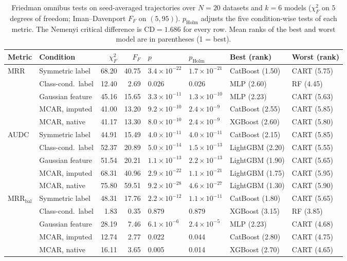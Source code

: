 \begin{table}[t]
\centering
\footnotesize
\setlength{\tabcolsep}{3.5pt}
\caption{Friedman omnibus tests on seed-averaged trajectories over $N=20$ datasets and $k=6$ models ($\chi^2_F$ on $5$ degrees of freedom; Iman--Davenport $F_F$ on $(5,95)$). $p_{\mathrm{Holm}}$ adjusts the five condition-wise tests of each metric. The Nemenyi critical difference is $\mathrm{CD}=1.686$ for every row. Mean ranks of the best and worst model are in parentheses (1 = best).}
\label{tab:friedman}
\begin{tabular}{@{}llrrllll@{}}
\toprule
Metric & Condition & $\chi^2_F$ & $F_F$ & $p$ & $p_{\mathrm{Holm}}$ & Best (rank) & Worst (rank) \\
\midrule
MRR & Symmetric label & 68.20 & 40.75 & $3.4\times10^{-22}$ & $1.7\times10^{-21}$ & CatBoost (1.50) & CART (5.75) \\
 & Class-cond.\ label & 12.40 & 2.69 & 0.026 & 0.026 & MLP (2.60) & RF (4.45) \\
 & Gaussian feature & 45.16 & 15.65 & $3.3\times10^{-11}$ & $1.3\times10^{-10}$ & MLP (2.23) & CART (5.63) \\
 & MCAR, imputed & 41.00 & 13.20 & $9.2\times10^{-10}$ & $2.4\times10^{-9}$ & CatBoost (2.55) & CART (5.85) \\
 & MCAR, native & 41.17 & 13.30 & $8.0\times10^{-10}$ & $2.4\times10^{-9}$ & XGBoost (2.60) & CART (5.80) \\
\midrule
AUDC & Symmetric label & 44.91 & 15.49 & $4.0\times10^{-11}$ & $4.0\times10^{-11}$ & CatBoost (2.15) & CART (5.85) \\
 & Class-cond.\ label & 52.37 & 20.89 & $5.0\times10^{-14}$ & $1.5\times10^{-13}$ & LightGBM (2.20) & CART (5.55) \\
 & Gaussian feature & 51.54 & 20.21 & $1.1\times10^{-13}$ & $2.2\times10^{-13}$ & LightGBM (1.90) & CART (5.65) \\
 & MCAR, imputed & 68.31 & 40.96 & $2.9\times10^{-22}$ & $1.1\times10^{-21}$ & LightGBM (1.75) & CART (5.95) \\
 & MCAR, native & 75.80 & 59.51 & $9.2\times10^{-28}$ & $4.6\times10^{-27}$ & LightGBM (1.30) & CART (5.90) \\
\midrule
MRR$_{\mathrm{bal}}$ & Symmetric label & 48.31 & 17.76 & $2.2\times10^{-12}$ & $1.1\times10^{-11}$ & CatBoost (1.80) & CART (5.65) \\
 & Class-cond.\ label & 1.83 & 0.35 & 0.879 & 0.879 & XGBoost (3.15) & RF (3.85) \\
 & Gaussian feature & 28.19 & 7.46 & $6.1\times10^{-6}$ & $2.4\times10^{-5}$ & MLP (2.23) & CART (4.68) \\
 & MCAR, imputed & 12.74 & 2.77 & 0.022 & 0.044 & CatBoost (2.80) & CART (4.75) \\
 & MCAR, native & 16.11 & 3.65 & 0.005 & 0.014 & XGBoost (2.70) & CART (4.65) \\
\bottomrule
\end{tabular}
\end{table}

